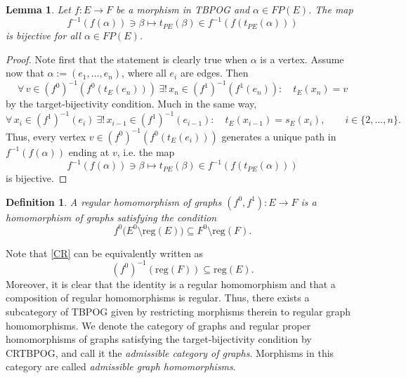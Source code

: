 \documentclass[12pt,times,a4paper]{amsart}
\newtheorem{lemma}[theorem]{Lemma}
\newtheorem{definition}[theorem]{Definition}
\numberwithin{equation}{section}
\numberwithin{equation}{section}
\begin{document}
\begin{lemma}\label{targetpath}
Let $f:E\to F$ be a morphism in TBPOG and $\alpha\in FP(E)$. The map
\[
f^{-1}(f(\alpha))\ni\beta\longmapsto t_{PE}(\beta)\in f^{-1}(f(t_{PE}(\alpha)))
\]
is bijective for all $\alpha\in FP(E)$.
\end{lemma}
\begin{proof} 
Note first that the statement is clearly true when $\alpha$ is a vertex. Assume now that $\alpha:=(e_1,\ldots, e_n)$, where all $e_i$ are edges. 
Then
\begin{equation}
\forall\,v\in (f^0)^{-1}(f^0(t_E(e_n)))~\exists!\,x_n\in (f^1)^{-1}(f^1(e_n)):\quad t_E(x_n)=v
\end{equation}
by the target-bijectivity condition. Much in the same way,
\begin{equation}
\forall\,x_i\in (f^1)^{-1}(e_i)~\exists!\,x_{i-1}\in (f^1)^{-1}(e_{i-1}):\quad t_E(x_{i-1})=s_E(x_i),\qquad i\in\{2,\ldots,n\}.
\end{equation}
Thus, every vertex $v\in (f^0)^{-1}(f^0(t_E(e_i)))$ generates a unique path in $f^{-1}(f(\alpha))$ ending at $v$, i.e. the map
\begin{equation}
f^{-1}(f(\alpha))\ni\beta\longmapsto t_{PE}(\beta)\in f^{-1}(f(t_{PE}(\alpha)))
\end{equation}
is bijective.
\end{proof}


\begin{definition}
A {\em regular homomorphism} of graphs $(f^0,f^1)\colon E\to F$ is a homomorphism of graphs satisfying the  condition
\begin{equation}\label{CR}
f^0\big(E^0\setminus\mathrm{reg}(E)\big)\subseteq F^0\setminus\mathrm{reg}(F).
\end{equation}
\end{definition}
\noindent
Note that \eqref{CR} can be equivalently written as
\begin{equation}\label{214}
(f^0)^{-1}(\mathrm{reg}(F))\subseteq\mathrm{reg}(E).
\end{equation}
Moreover, it is clear that the identity is a regular homomorphism and that a composition of regular homomorphisms is regular. Thus, there 
exists a subcategory of {\rm TBPOG} given by restricting morphisms therein to regular graph homomorphisms.
We denote the category of graphs and regular proper  homomorphisms of graphs satisfying the target-bijectivity condition by 
{\rm CRTBPOG}, 
and call it the  {\em admissible category of graphs}. Morphisms in this category are called \emph{admissible graph homomorphisms}.
\end{document}
